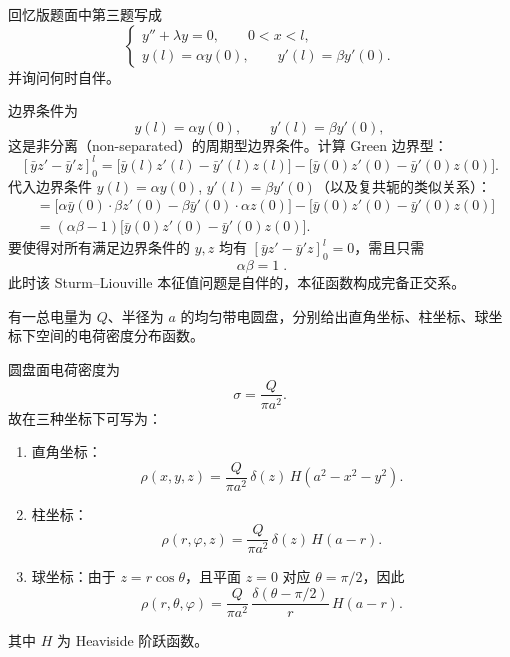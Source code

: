 \begin{question}[本征值问题的自伴性]

回忆版题面中第三题写成
\[
\begin{cases}
y''+\lambda y=0,\qquad 0<x<l,\\
y(l)=\alpha y(0),\qquad y'(l)=\beta y'(0).
\end{cases}
\]
并询问何时自伴。

\begin{solution}

边界条件为
\[
 y(l)=\alpha y(0),\qquad y'(l)=\beta y'(0),
\]
这是非分离（non-separated）的周期型边界条件。计算 Green 边界型：
\[
[\bar y z'-\bar y' z]_{0}^{l}
= \bigl[\bar y(l)z'(l)-\bar y'(l)z(l)\bigr]
- \bigl[\bar y(0)z'(0)-\bar y'(0)z(0)\bigr].
\]
代入边界条件 $y(l)=\alpha y(0)$, $y'(l)=\beta y'(0)$（以及复共轭的类似关系）：
\begin{align*}
&= \bigl[\alpha\bar y(0)\cdot\beta z'(0)-\beta\bar y'(0)\cdot\alpha z(0)\bigr]
- \bigl[\bar y(0)z'(0)-\bar y'(0)z(0)\bigr] \\
&= (\alpha\beta-1)\bigl[\bar y(0)z'(0)-\bar y'(0)z(0)\bigr].
\end{align*}
要使得对所有满足边界条件的 $y,z$ 均有 $[\bar y z'-\bar y' z]_{0}^{l}=0$，需且只需
\[
\boxed{\;\alpha\beta = 1\;}.
\]
此时该 Sturm--Liouville 本征值问题是自伴的，本征函数构成完备正交系。


\end{solution}
\end{question}

\begin{question}[均匀带电圆盘的电荷密度]

有一总电量为 $Q$、半径为 $a$ 的均匀带电圆盘，分别给出直角坐标、柱坐标、球坐标下空间的电荷密度分布函数。

\begin{solution}

圆盘面电荷密度为
\[
\sigma=\frac{Q}{\pi a^2}.
\]
故在三种坐标下可写为：
\begin{enumerate}[label=(\arabic*),leftmargin=2.6em,itemsep=0.25em,topsep=0.2em]
\item 直角坐标：
\[
\rho(x,y,z)=\frac{Q}{\pi a^2}\,\delta(z)\,H(a^2-x^2-y^2).
\]
\item 柱坐标：
\[
\rho(r,\varphi,z)=\frac{Q}{\pi a^2}\,\delta(z)\,H(a-r).
\]
\item 球坐标：由于 $z=r\cos\theta$，且平面 $z=0$ 对应 $\theta=\pi/2$，因此
\[
\rho(r,\theta,\varphi)=\frac{Q}{\pi a^2}\,\frac{\delta(\theta-\pi/2)}{r}\,H(a-r).
\]
\end{enumerate}
其中 $H$ 为 Heaviside 阶跃函数。


\end{solution}
\end{question}

